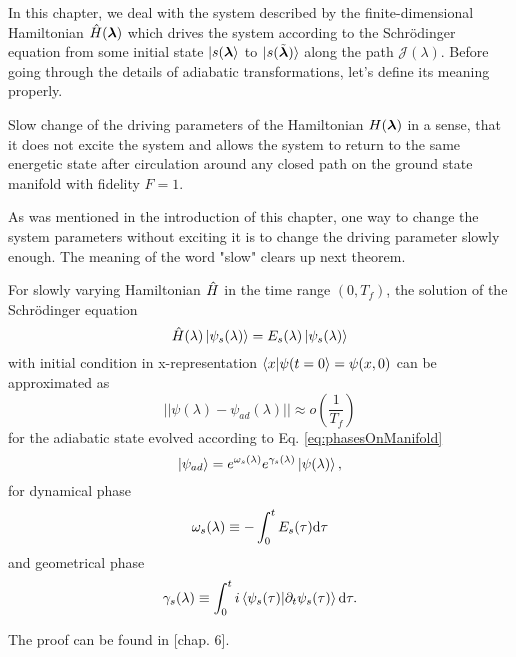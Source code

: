 In this chapter, we deal with the system described by the finite-dimensional Hamiltonian $\hat{H}({\bm\lambda})$ which drives the system according to the Schr\"odinger equation from some initial state $\ket{s({\bm\lambda}}$ to $\ket{s(\tilde{{\bm\lambda}})}$ along the path $\mathcal J(\lambda)$. Before going through the details of adiabatic transformations, let's define its meaning properly.

\begin{definition}[Adibaticity]
    Slow change of the driving parameters of the Hamiltonian $H({\bm\lambda})$ in a sense, that it does not excite the system and allows the system to return to the same energetic state after circulation around any closed path on the ground state manifold with fidelity $F=1$. 
\end{definition}


As was mentioned in the introduction of this chapter, one way to change the system parameters without exciting it is to change the driving parameter slowly enough. The meaning of the word "slow" clears up next theorem.
\begin{thm}
    \label{adiabaticTheorem}
    For slowly varying Hamiltonian $\hat{H}$ in the time range $(0,T_f)$, the solution of the Schrödinger equation 
    $$\hat{H}(\lambda)\ket{\psi_s(\lambda)} = E_s(\lambda)\ket{\psi_s(\lambda)}$$
    with initial condition in x-representation $\braket{x|\psi(t=0}=\psi(x,0)$ can be approximated as
    \begin{equation}
      ||\psi(\lambda) - \psi_{ad}(\lambda)||\approx o\left(\frac{1}{T_f}\right)
    \end{equation}
    for the adiabatic state evolved according to Eq. \ref{eq:phasesOnManifold}
    \begin{equation}
        \ket{\psi_{ad}}= e^{\omega_s(\lambda)}e^{\gamma_s(\lambda)}\ket{\psi(\lambda)},
    \end{equation}
    for dynamical phase
    $$\omega_s(\lambda)\equiv -\int_0^t E_s(\tau)\mathrm{d} \tau$$
    and geometrical phase
        $$\gamma_s(\lambda)\equiv \int_0^t i\braket{\psi_s(\tau)|\partial_t\psi_s(\tau)} \mathrm{d} \tau .$$
\end{thm}
\begin{myproof}
    The proof can be found in \cite{sakurai}[chap. 6].
\end{myproof}














